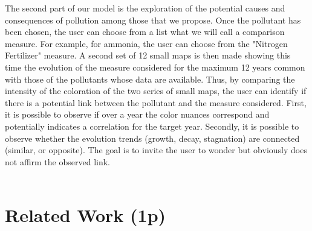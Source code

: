 \documentclass[preprint,journal]{vgtc}       %
\begin{document}
The second part of our model is the exploration of the potential causes and consequences of pollution among those that we propose. Once the pollutant has been chosen, the user can choose from a list what we will call a comparison measure. For example, for ammonia, the user can choose from the "Nitrogen Fertilizer" measure. A second set of 12 small maps is then made showing this time the evolution of the measure considered for the maximum 12 years common with those of the pollutants whose data are available.
\newline
Thus, by comparing the intensity of the coloration of the two series of small maps, the user can identify if there is a potential link between the pollutant and the measure considered. First, it is possible to observe if over a year the color nuances correspond and potentially indicates a correlation for the target year. Secondly, it is possible to observe whether the evolution trends (growth, decay, stagnation) are connected (similar, or opposite). The goal is to invite the user to wonder but obviously does not affirm the observed link.
~\\
~\\




\section{Related Work (1p)}
\end{document}
